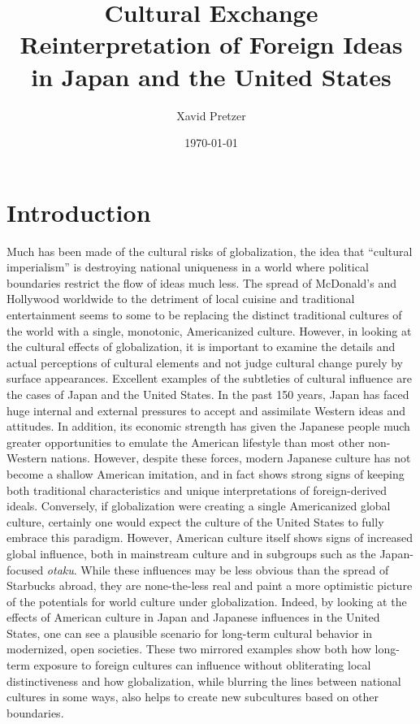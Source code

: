 \documentclass[12pt]{article}
\title{Cultural Exchange\\{\Large Reinterpretation of Foreign Ideas in Japan and the United States}}
\author{Xavid Pretzer}
\date{\today}
\begin{document}
\maketitle

\doublespacing

\section{Introduction}


Much has been made of the cultural risks of globalization, the idea that ``cultural imperialism'' is destroying national uniqueness in a world where political boundaries restrict the flow of ideas much less. 
The spread of McDonald's and Hollywood worldwide to the detriment of local cuisine and traditional entertainment seems to some to be replacing the distinct traditional cultures of the world with a single, monotonic, Americanized culture.  However, in looking at the cultural effects of globalization, it is important to examine the details and actual perceptions of cultural elements and not judge cultural change purely by surface appearances.  Excellent examples of the subtleties of cultural influence are the cases of Japan and the United States.  In the past 150 years, Japan has faced huge internal and external pressures to accept and assimilate Western ideas and attitudes.  In addition, its economic strength has given the Japanese people much greater opportunities to emulate the American lifestyle than most other non-Western nations.  However, despite these forces, modern Japanese culture has not become a shallow American imitation, and in fact shows strong signs of keeping both traditional characteristics and unique interpretations of foreign-derived ideals.  Conversely, if globalization were creating a single Americanized global culture, certainly one would expect the culture of the United States to fully embrace this paradigm.  However, American culture itself shows signs of increased global influence, both in mainstream culture and in subgroups such as the Japan-focused \emph{otaku}.  While these influences may be less obvious than the spread of Starbucks abroad, they are none-the-less real and paint a more optimistic picture of the potentials for world culture under globalization.
Indeed, by looking at the effects of American culture in Japan and Japanese influences in the United States, one can see a plausible scenario for long-term cultural behavior in modernized, open societies.  These two mirrored examples show both how long-term exposure to foreign cultures can influence without obliterating local distinctiveness and how globalization, while blurring the lines between national cultures in some ways, also helps to create new subcultures based on other boundaries. 
\end{document}
